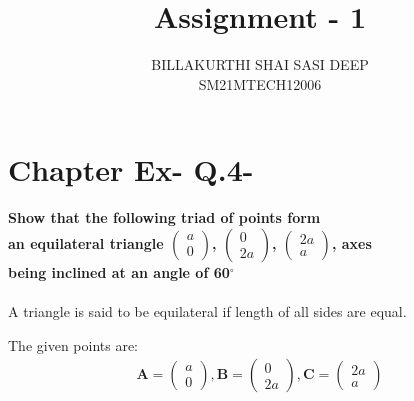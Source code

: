 \documentclass[journal,12pt,twocolumn]{IEEEtran}
\begin{document}
\newcommand{\myvec}[1]{\ensuremath{\begin{pmatrix}#1\end{pmatrix}}}
\newcommand{\cmyvec}[1]{\ensuremath{\begin{pmatrix*}[c]#1\end{pmatrix*}}}
\providecommand{\norm}[1]{\lVert#1\rVert}
\newcommand{\mydet}[1]{\ensuremath{\begin{vmatrix}#1\end{vmatrix}}}
\newcommand{\proj}[2]{\textbf{proj}_{\vec{#1}}\vec{#2}}
\newcommand{\abs}[1]{\left\lvert#1\right\rvert}
\newcommand{\RNum}[1]{\uppercase\expandafter{\romannumeral #1\relax}}
\newcommand{\Rnum}[1]{\lowercase\expandafter{\romannumeral #1\relax}}
\let\StandardTheFigure\thefigure
\let\vec\mathbf
\title{
Assignment - 1
}
\author{BILLAKURTHI SHAI SASI DEEP\\ SM21MTECH12006}
\maketitle
\newpage
\bigskip

\section*{ Chapter \RNum{2} Ex-\RNum{2} Q.4-\Rnum{2}}
\vspace{0.3cm}
\noindent
\textbf{Show that the following triad of points form
\vspace{0.3cm}\\
an equilateral triangle \myvec{a\\0}, \myvec{0\\2a}, \myvec{2a\\a}, axes 
\vspace{0.3cm}\\
being inclined at an angle of 60$^{\circ}$} \\
\\
\vspace{0.3cm}
A triangle is said to be equilateral if length of all sides are equal.
\vspace{0.6cm} 

The given points are:
\begin{align*}
\vec{A} = \myvec{a\\0}, \vec{B} =\myvec{0\\2a},
\vec{C} =\myvec{2a\\a}
\end{align*}
\end{document}
